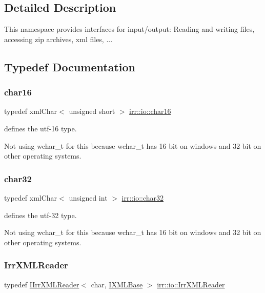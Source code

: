 \subsection{Detailed Description}
This namespace provides interfaces for input/output\+: Reading and writing files, accessing zip archives, xml files, ... 

\subsection{Typedef Documentation}
\mbox{\label{namespaceirr_1_1io_afcc06f885f299b3df6cacd15fbe0499a}} 
\subsubsection{\texorpdfstring{char16}{char16}}
{\footnotesize\ttfamily typedef xml\+Char$<$ unsigned short $>$ \hyperlink{namespaceirr_1_1io_afcc06f885f299b3df6cacd15fbe0499a}{irr\+::io\+::char16}}



defines the utf-\/16 type. 

Not using wchar\+\_\+t for this because wchar\+\_\+t has 16 bit on windows and 32 bit on other operating systems. \mbox{\label{namespaceirr_1_1io_ae3a0c616a13e7b98b0f83e187f4f4a60}} 
\subsubsection{\texorpdfstring{char32}{char32}}
{\footnotesize\ttfamily typedef xml\+Char$<$ unsigned int $>$ \hyperlink{namespaceirr_1_1io_ae3a0c616a13e7b98b0f83e187f4f4a60}{irr\+::io\+::char32}}



defines the utf-\/32 type. 

Not using wchar\+\_\+t for this because wchar\+\_\+t has 16 bit on windows and 32 bit on other operating systems. \mbox{\label{namespaceirr_1_1io_a682f8a2c4c57259bfde1ec8fa27a565b}} 
\subsubsection{\texorpdfstring{Irr\+X\+M\+L\+Reader}{IrrXMLReader}}
{\footnotesize\ttfamily typedef \hyperlink{classirr_1_1io_1_1IIrrXMLReader}{I\+Irr\+X\+M\+L\+Reader}$<$ char, \hyperlink{classirr_1_1io_1_1IXMLBase}{I\+X\+M\+L\+Base} $>$ \hyperlink{namespaceirr_1_1io_a682f8a2c4c57259bfde1ec8fa27a565b}{irr\+::io\+::\+Irr\+X\+M\+L\+Reader}}



